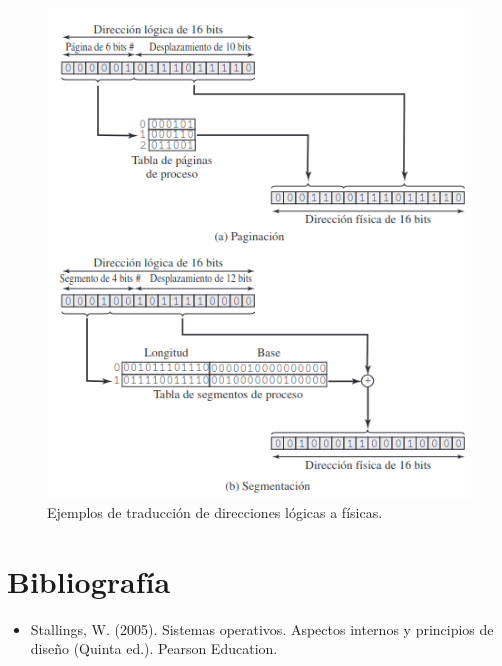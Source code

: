 \documentclass[12pt,a4paper]{article}
\begin{document}
\begin{figure}[H]
    \centering
    \includegraphics[width=15cm]{segmentacion.png}
    \caption{Ejemplos de traducción de direcciones lógicas a físicas.}
\end{figure}


\section {Bibliografía}
\begin{itemize}
    \item Stallings, W. (2005). Sistemas operativos. Aspectos internos y principios de diseño (Quinta ed.). Pearson Education.
\end{itemize}
\end{document}

